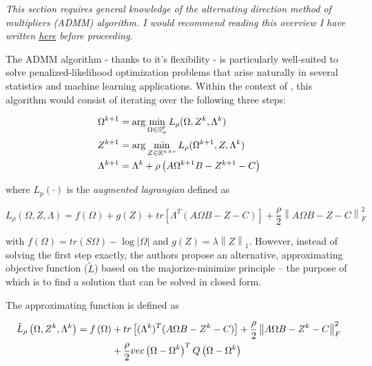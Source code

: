 \documentclass[11pt,]{report}
\begin{document}
\emph{This section requires general knowledge of the alternating direction method of multipliers (ADMM) algorithm. I would recommend reading this overview I have written \href{https://mgallow.github.io/ADMMsigma/articles/Details.html\#admm-algorithm}{here} before proceeding.}

The ADMM algorithm - thanks to it's flexibility - is particularly well-suited to solve penalized-likelihood optimization problems that arise naturally in several statistics and machine learning applications. Within the context of \citet{molstad2017shrinking}, this algorithm would consist of iterating over the following three steps:

\begin{align}
  \Omega^{k + 1} &= \arg\min_{\Omega \in \mathbb{S}_{+}^{p}}L_{\rho}(\Omega, Z^{k}, \Lambda^{k}) \label{eq:omegaauglagrange2}\notag \\
  Z^{k + 1} &= \arg\min_{Z \in \mathbb{R}^{n \times r}}L_{\rho}(\Omega^{k + 1}, Z, \Lambda^{k}) \label{eq:ZZauglagrange2}\notag \\
  \Lambda^{k + 1} &= \Lambda^{k} + \rho\left(A\Omega^{k + 1}B - Z^{k + 1} - C \right) \label{eq:lamauglagrange2}\notag
\end{align}

where \(L_{p}(\cdot)\) is the \emph{augmented lagrangian} defined as

\begin{equation}
L_{\rho}(\Omega, Z, \Lambda) = f\left(\Omega\right) + g\left(Z\right) + tr\left[\Lambda^{T}\left(A\Omega B - Z - C\right)\right] + \frac{\rho}{2}\left\|A\Omega B - Z - C\right\|_{F}^{2}
\label{eq:auglagrange2}
\end{equation}

with \(f\left(\Omega\right) = tr\left(S\Omega\right) - \log\left|\Omega\right|\) and \(g\left(Z\right) = \lambda\left\|Z\right\|_{1}\). However, instead of solving the first step exactly, the authors propose an alternative, approximating objective function (\(\tilde{L}\)) based on the majorize-minimize principle -- the purpose of which is to find a solution that can be solved in closed form.

The approximating function is defined as

\begin{equation}
\begin{split}
  \tilde{L}_{\rho}\left(\Omega, Z^{k}, \Lambda^{k}\right) = f\left(\Omega\right) &+ tr\left[(\Lambda^{k})^{T}(A\Omega B - Z^{k} - C) \right] + \frac{\rho}{2}\left\|A\Omega B - Z^{k} - C \right\|_{F}^{2} \\
  &+ \frac{\rho}{2}vec\left(\Omega - \Omega^{k}\right)^{T}Q\left(\Omega - \Omega^{k}\right)\notag
\label{eq:approx}
\end{split}
\end{equation}
\end{document}

